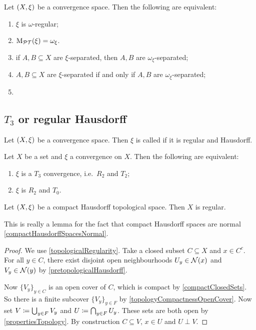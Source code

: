\begin{proposition}
Let $\sSet{X,\xi}$ be a convergence space. Then the following are equivalent:
\begin{enumerate}
\item $\xi$ is $\omega$-regular;
\item $\operatorname{M_\mathcal{PT}}(\xi) = \omega_\xi$.
\item if $A,B\subseteq X$ are $\xi$-separated, then $A,B$ are $\omega_\xi$-separated;
\item $A,B\subseteq X$ are $\xi$-separated \textup{if and only if} $A,B$ are $\omega_\xi$-separated;
\item 
\end{enumerate}
\end{proposition}

\subsection{$T_3$ or regular Hausdorff}
\begin{definition}
Let $\sSet{X,\xi}$ be a convergence space. Then $\xi$ is called  if it is regular and Hausdorff.
\end{definition}

\begin{proposition}
Let $X$ be a set and $\xi$ a convergence on $X$. Then the following are equivalent:
\begin{enumerate}
\item $\xi$ is a $T_3$ convergence, i.e.\ $R_2$ and $T_2$;
\item $\xi$ is $R_2$ and $T_0$.
\end{enumerate}
\end{proposition}

\begin{lemma} \label{compactHausdorffSpacesRegular}
Let $\sSet{X,\xi}$ be a compact Hausdorff topological space. Then $X$ is regular.
\end{lemma}
This is really a lemma for the fact that compact Hausdorff spaces are normal \ref{compactHausdorffSpacesNormal}.
\begin{proof}
We use \ref{topologicalRegularity}. Take a closed subset $C\subseteq X$ and $x\in C^c$. For all $y\in C$, there exist disjoint open neighbourhoods $U_y \in \operatorname{\mathcal{N}}(x)$ and $V_y\in \operatorname{\mathcal{N}}(y)$ by \ref{pretopologicalHausdorff}.

Now $\{V_y\}_{y\in C}$ is an open cover of $C$, which is compact by \ref{compactClosedSets}. So there is a finite subcover $\{V_y\}_{y\in F}$ by \ref{topologyCompactnessOpenCover}. Now set $V \coloneqq \bigcup_{y\in F}V_y$ and $U \coloneqq \bigcap_{y\in F}U_y$. These sets are both open by \ref{propertiesTopology}. By construction $C\subseteq V$, $x\in U$ and $U\perp V$.
\end{proof}

